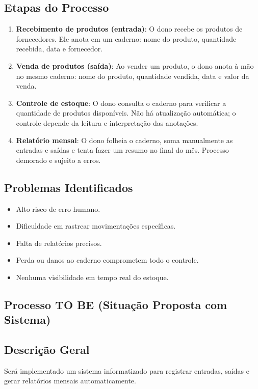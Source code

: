 \documentclass[
	12pt,				%
	openany,			%
	twoside,			%
	a4paper,			%
	english,			%
	brazil				%
	]{abntex2}
\begin{document}
\subsection*{Etapas do Processo}

\begin{enumerate}
    \item \textbf{Recebimento de produtos (entrada)}: O dono recebe os produtos de fornecedores. Ele anota em um caderno: nome do produto, quantidade recebida, data e fornecedor.
    
    \item \textbf{Venda de produtos (saída)}: Ao vender um produto, o dono anota à mão no mesmo caderno: nome do produto, quantidade vendida, data e valor da venda.
    
    \item \textbf{Controle de estoque}: O dono consulta o caderno para verificar a quantidade de produtos disponíveis. Não há atualização automática; o controle depende da leitura e interpretação das anotações.
    
    \item \textbf{Relatório mensal}: O dono folheia o caderno, soma manualmente as entradas e saídas e tenta fazer um resumo no final do mês. Processo demorado e sujeito a erros.
\end{enumerate}

\subsection*{Problemas Identificados}

\begin{itemize}
    \item Alto risco de erro humano.
    \item Dificuldade em rastrear movimentações específicas.
    \item Falta de relatórios precisos.
    \item Perda ou danos ao caderno comprometem todo o controle.
    \item Nenhuma visibilidade em tempo real do estoque.
\end{itemize}

\subsection{Processo TO BE (Situação Proposta com Sistema)}

\subsection*{Descrição Geral}
Será implementado um sistema informatizado para registrar entradas, saídas e gerar relatórios mensais automaticamente.
\end{document}
